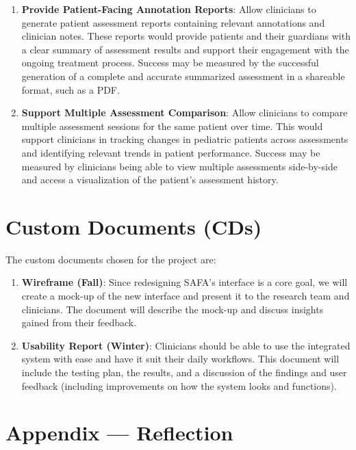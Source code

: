\documentclass{article}
\begin{document}
\begin{enumerate}
  \item \textbf{Provide Patient-Facing Annotation Reports}: Allow clinicians to generate patient assessment reports containing relevant annotations and clinician notes. These reports would provide patients and their guardians with a clear summary of assessment results and support their engagement with the ongoing treatment process. Success may be measured by the successful generation of a complete and accurate summarized assessment in a shareable format, such as a PDF.
    
  \item \textbf{Support Multiple Assessment Comparison}: Allow clinicians to compare multiple assessment sessions for the same patient over time. This would support clinicians in tracking changes in pediatric patients across assessments and identifying relevant trends in patient performance. Success may be measured by clinicians being able to view multiple assessments side-by-side and access a visualization of the patient’s assessment history.

\end{enumerate}

\section{Custom Documents (CDs)}

The custom documents chosen for the project are:

\begin{enumerate}
    \item \textbf{Wireframe (Fall)}: Since redesigning SAFA's interface is a core goal, we will create a mock-up of the new interface
    and present it to the research team and clinicians. The document will describe the mock-up and discuss insights gained from
    their feedback.
    \item \textbf{Usability Report (Winter)}: Clinicians should be able to use the integrated system with ease and have it suit their daily workflows.
    This document will include the testing plan, the results, and a discussion of the findings and user feedback (including improvements on how the system looks and functions).
\end{enumerate}

\newpage{}

\section*{Appendix --- Reflection}
\end{document}
